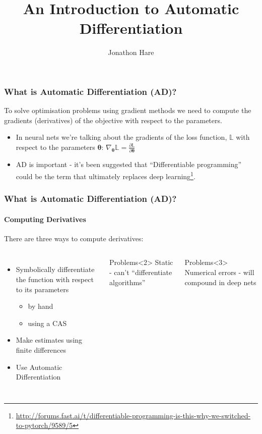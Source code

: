 \documentclass[\beamerclass]{beamer}
\title[Automatic Differentiation]{An Introduction to Automatic Differentiation}
\author{Jonathon Hare}
\institute[]
{
  Vision, Learning and Control\\
  University of Southampton 
}
\date{}
\begin{document}

\begin{frame}
\frametitle{What is Automatic Differentiation (AD)?}
To solve optimisation problems using gradient methods we need to compute the gradients (derivatives) of the objective with respect to the parameters.
\begin{itemize}
	\item In neural nets we're talking about the gradients of the loss function, $\mathbb{L}$ with respect to the parameters $\bm{\theta}$: 
	$\nabla_{\bm{\theta}} \mathbb{L} = \frac{\partial \mathbb{L}}{\partial \bm{\theta}}$
	\item AD is important - it's been suggested that ``Differentiable programming'' could be the term that ultimately replaces deep learning\footnote{\url{http://forums.fast.ai/t/differentiable-programming-is-this-why-we-switched-to-pytorch/9589/5}}.
\end{itemize}
\end{frame}

\begin{frame}
	\frametitle{What is Automatic Differentiation (AD)?}
	\framesubtitle{Computing Derivatives}
There are three ways to compute derivatives:

\begin{columns}
    \begin{itemize}
    	\item<1,2> Symbolically differentiate the function with respect to its parameters
    	\begin{itemize}
    		\item by hand
    		\item using a CAS
    	\end{itemize}
    	\item<1,3> Make estimates using finite differences
    	\item<1,4> Use Automatic Differentiation
    \end{itemize}

      \begin{block}{Problems}<2>
        Static - can't ``differentiate algorithms''
      \end{block}
      \begin{block}{Problems}<3>
        Numerical errors - will compound in deep nets
      \end{block}
  \end{columns}
\end{frame}
\end{document}
